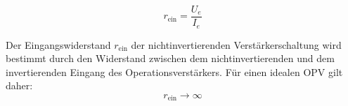 \[r_{\mathrm{ein}} = \frac{U_e}{I_e}\]

Der Eingangswiderstand $r_{\mathrm{ein}}$ der nichtinvertierenden
Verstärkerschaltung wird bestimmt durch den Widerstand zwischen dem
nichtinvertierenden und dem invertierenden Eingang des Operationsverstärkers.
Für einen idealen OPV gilt daher:
\[r_{\mathrm{ein}} \rightarrow \infty\]